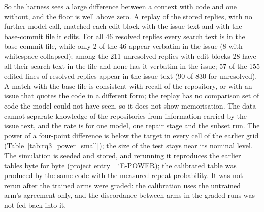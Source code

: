 \documentclass[10pt,twocolumn]{article}
\newcommand{\entry}[1]{{\ttfamily\hyphenchar\font=`\-\relax #1}}
\begin{document}
So the harness sees a large difference between a context with code and one without, and the floor is well above zero.
A replay of the stored replies, with no further model call, matched each edit block with the issue text and with the base-commit file it edits. For all 46 resolved replies every search text is in the base-commit file, while only 2 of the 46 appear verbatim in the issue (8 with whitespace collapsed); among the 211 unresolved replies with edit blocks 28 have all their search text in the file and none has it verbatim in the issue; 57 of the 155 edited lines of resolved replies appear in the issue text (90 of 830 for unresolved). %
A match with the base file is consistent with recall of the repository, or with an issue that quotes the code in a different form; the replay has no comparison set of code the model could not have seen, so it does not show memorisation. %
The data cannot separate knowledge of the repositories from information carried by the issue text, and the rate is for one model, one repair stage and the subset run.
The power of a four-point difference is below the target in every cell of the earlier grid (Table~\ref{tab:rq3_power_small}); the size of the test stays near its nominal level.
The simulation is seeded and stored, and rerunning it reproduces the earlier tables byte for byte (project entry \entry{E-POWER}); the calibrated table was produced by the same code with the measured repeat probability.
It was not rerun after the trained arms were graded: the calibration uses the untrained arm's agreement only, and the discordance between arms in the graded runs was not fed back into it.

\end{document}
